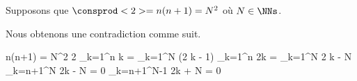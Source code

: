 Supposons que $\consprod<2> = n(n+1) = N^2$ où $N \in \NNs$.
 
\smallskip

Nous obtenons une contradiction comme suit.
	
\medskip

\begin{stepcalc}[style = ar*, ope = \iff]
	n(n+1) = N^2
	2 \dsum_{k=1}^{n} k = \dsum_{k=1}^{N} (2 k - 1)
\explnext{}
	\dsum_{k=1}^{n} 2k = \dsum_{k=1}^{N} 2 k - N
	\dsum_{k=n+1}^{N} 2k - N = 0
	\dsum_{k=n+1}^{N-1} 2k + N = 0
\end{stepcalc}

\vspace{-2ex}	
\leavevmode